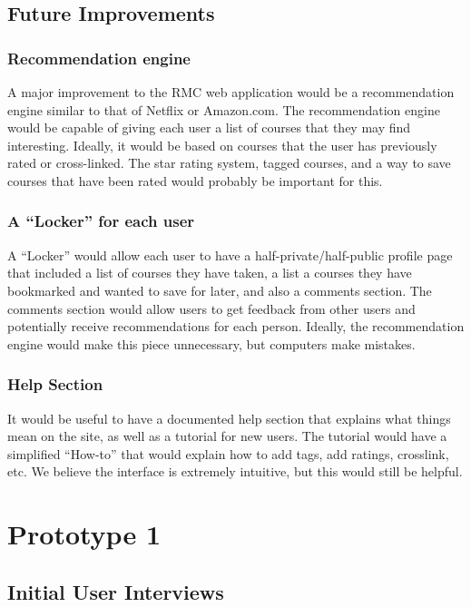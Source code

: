 \documentclass[12pt]{report}
\begin{document}
\section{Future Improvements}

\subsection{Recommendation engine}

A major improvement to the RMC web application would be a recommendation engine similar to that of Netflix or Amazon.com.  The recommendation engine would be capable of giving each user a list of courses that they may find interesting.  Ideally, it would be based on courses that the user has previously rated or cross-linked.  The star rating system, tagged courses, and a way to save courses that have been rated would probably be important for this.

\subsection{A ``Locker'' for each user}

A ``Locker'' would allow each user to have a half-private/half-public profile page that included a list of courses they have taken, a list a courses they have bookmarked and wanted to save for later, and also a comments section. The comments section would allow users to get feedback from other users and potentially receive recommendations for each person.  Ideally, the recommendation engine would make this piece unnecessary, but computers make mistakes.

\subsection{Help Section}

It would be useful to have a documented help section that explains what things mean on the site, as well as a tutorial for new users.  The tutorial would have a simplified ``How-to'' that would explain how to add tags, add ratings, crosslink, etc.  We believe the interface is extremely intuitive, but this would still be helpful.


\appendix

\chapter{Prototype 1}

\section{Initial User Interviews}
\end{document}
